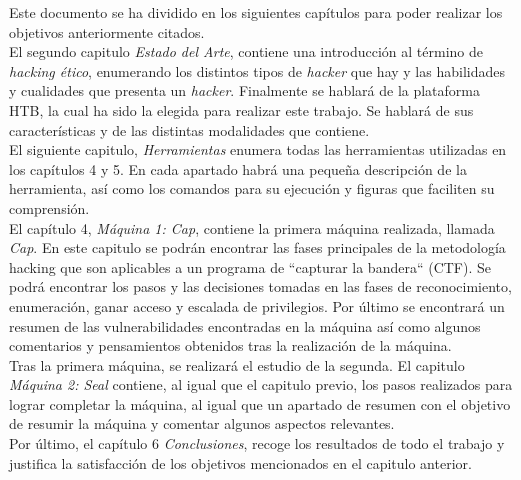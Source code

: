 Este documento se ha dividido en los siguientes capítulos para poder realizar los objetivos anteriormente citados.\\

El segundo capitulo \textit{Estado del Arte}, contiene una introducción al término de \textit{hacking ético}, enumerando los distintos tipos de \textit{hacker} que hay y las habilidades y cualidades que presenta un \textit{hacker}. Finalmente se hablará de la plataforma \acrlong{HTB}, la cual ha sido la elegida para realizar este trabajo. Se hablará de sus características y de las distintas modalidades que contiene.\\

El siguiente capitulo, \textit{Herramientas} enumera todas las herramientas utilizadas en los capítulos 4 y 5. En cada apartado habrá una pequeña descripción de la herramienta, así como los comandos para su ejecución y figuras que faciliten su comprensión.\\

El capítulo 4, \textit{Máquina 1: Cap}, contiene la primera máquina realizada, llamada \textit{Cap}. En este capitulo se podrán encontrar las fases principales de la metodología hacking que son aplicables a un programa de ``capturar la bandera`` (\acrlong{CTF}). Se podrá encontrar los pasos y las decisiones tomadas en las fases de reconocimiento, enumeración, ganar acceso y escalada de privilegios. Por último se encontrará un resumen de las vulnerabilidades encontradas en la máquina así como algunos comentarios y pensamientos obtenidos tras la realización de la máquina.\\

Tras la primera máquina, se realizará el estudio de la segunda. El capitulo \textit{Máquina 2: Seal} contiene, al igual que el capitulo previo, los pasos realizados para lograr completar la máquina, al igual que un apartado de resumen con el objetivo de resumir la máquina y comentar algunos aspectos relevantes.\\

Por último, el capítulo 6 \textit{Conclusiones}, recoge los resultados de todo el trabajo y justifica la satisfacción de los objetivos mencionados en el capitulo anterior.
